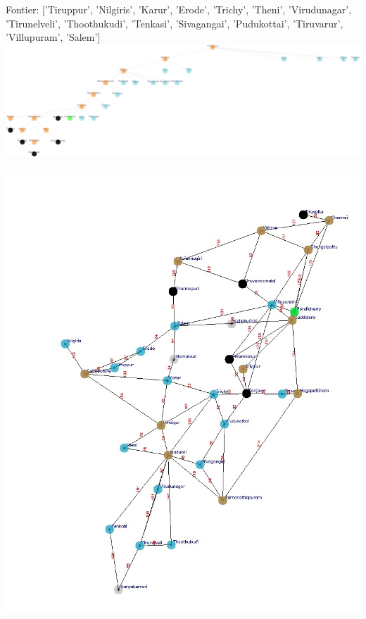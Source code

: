 \documentclass[xcolor=table]{beamer}
\begin{document}
\begin{frame}
  { \tiny Fontier: ['Tiruppur', 'Nilgiris', 'Karur', 'Erode', 'Trichy', 'Theni', 'Virudunagar', 'Tirunelveli', 'Thoothukudi', 'Tenkasi', 'Sivagangai', 'Pudukottai', 'Tiruvarur', 'Villupuram', 'Salem']}
  \includegraphics[width=1\textwidth]{../DFSNodes/24-1.png}
  \begin{center}
    \includegraphics[height=0.45\textheight]{../DFSoutput/tamilDFS22.jpg}
  \end{center}
\end{frame}
\end{document}
